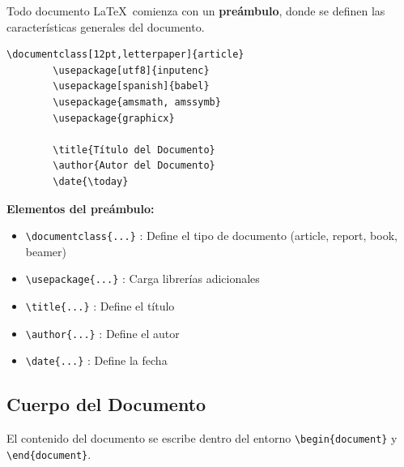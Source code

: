 \documentclass[11pt,letterpaper]{article}
\newcommand{\comando}[1]{\textcolor{azulprofundo}{\texttt{#1}}}
\begin{document}
	Todo documento \LaTeX \ comienza con un \textbf{preámbulo}, donde se definen las características generales del documento.
	
	\begin{lstlisting}[caption=Estructura del preámbulo]
		\documentclass[12pt,letterpaper]{article}
		\usepackage[utf8]{inputenc}
		\usepackage[spanish]{babel}
		\usepackage{amsmath, amssymb}
		\usepackage{graphicx}
		
		\title{Título del Documento}
		\author{Autor del Documento}
		\date{\today}
	\end{lstlisting}
	
	\begin{cajateoria}
		\textbf{Elementos del preámbulo:}
		\begin{itemize}
			\item \comando{\textbackslash documentclass\{...\}} : Define el tipo de documento (article, report, book, beamer)
			\item \comando{\textbackslash usepackage\{...\}} : Carga librerías adicionales
			\item \comando{\textbackslash title\{...\}} : Define el título
			\item \comando{\textbackslash author\{...\}} : Define el autor
			\item \comando{\textbackslash date\{...\}} : Define la fecha
		\end{itemize}
	\end{cajateoria}
	
	\subsection{Cuerpo del Documento}
	
	El contenido del documento se escribe dentro del entorno \comando{\textbackslash begin\{document\}} y \comando{\textbackslash end\{document\}}.
	
\end{document}
